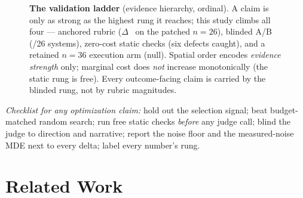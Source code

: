\documentclass[11pt]{article}
\begin{document}
\begin{figure}[t]\centering
{}
\caption{\textbf{The validation ladder} (evidence hierarchy, ordinal). A claim is
only as strong as the highest rung it reaches; this study climbs all four ---
anchored rubric ($\Delta$~\swDeltaFBP{} on the patched $n{=}26$), blinded A/B
(\swBlindMajP/26 systems), zero-cost static checks (six defects caught), and a
retained $n{=}36$ execution arm (null). Spatial order encodes \emph{evidence
strength} only; marginal cost does \emph{not} increase monotonically (the static
rung is free). Every outcome-facing claim is carried by the blinded rung, not by
rubric magnitudes.}
\label{fig:ladder}
\end{figure}

\noindent\emph{Checklist for any optimization claim:} hold out the selection
signal; beat budget-matched random search; run free static checks \emph{before}
any judge call; blind the judge to direction and narrative; report the noise
floor and the measured-noise MDE next to every delta; label every number's rung.

\section{Related Work}
\label{sec:related}
\end{document}
